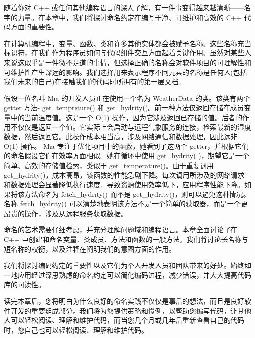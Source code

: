 随着你对 C++ 或任何其他编程语言的深入了解，有一件事变得越来越清晰——名字的力量。在本章中，我们将探讨命名约定在编写干净、可维护和高效的 C++ 代码方面的重要性。

在计算机编程中，变量、函数、类和许多其他实体都会被赋予名称。这些名称充当标识符，在我们作为程序员如何与代码组件交互方面起着关键作用。虽然对某些人来说这似乎是一件微不足道的事情，但选择正确的名称会对软件项目的可理解性和可维护性产生深远的影响。我们选择用来表示程序不同元素的名称是任何人(包括我们未来的自己)在接触我们的代码时所拥有的第一层文档。

假设一位名叫 Mia 的开发人员正在使用一个名为 WeatherData 的类。该类有两个 getter 方法- get\_tempreture() 和 get\_hydrity()。前一种方法仅返回存储在成员变量中的当前温度值。这是一个 O(1) 操作，因为它涉及返回已存储的值。后者的作用不仅仅是返回一个值。它实际上会启动与远程气象服务的连接，检索最新的湿度数据，然后返回它。此操作成本相当高，涉及网络通信和数据处理，因此远非 O(1) 操作。 Mia 专注于优化项目中的函数，她看到了这两个 getter，并根据它们的命名假设它们在效率方面相似。她在循环中使用 get\_hydrity( )，期望它是一个简单、高效的存储值检索，类似于 get\_temperature()。由于重复调用 get\_hydrity()，成本高昂，该函数的性能急剧下降。每次调用所涉及的网络请求和数据处理会显著降低执行速度，导致资源使用效率低下，应用程序性能下降。如果将该方法命名为 fetch\_hydrity() 而不是 get\_hydrity()，则可以避免这种情况。名称 fetch\_hydrity() 可以清楚地表明该方法不是一个简单的获取器，而是一个更昂贵的操作，涉及从远程服务获取数据。

命名的艺术需要仔细考虑，并充分理解问题域和编程语言。本章全面讨论了在 C++ 中创建和命名变量、类成员、方法和函数的一般方法。我们将讨论长名称与短名称的权衡，以及注释在阐明我们的意图方面的作用。

我们将探讨编码约定的重要性以及它们为个人开发人员和团队带来的好处。始终如一地应用经过深思熟虑的命名约定可以简化编码过程，减少错误，并大大提高代码库的可读性。

读完本章后，您将明白为什么良好的命名实践不仅仅是事后的想法，而且是良好软件开发的重要组成部分。我们将为您提供策略和惯例，以帮助您编写代码，让其他人可以轻松阅读、理解和维护代码，而当您几个月或几年后重新查看自己的代码时，您自己也可以轻松阅读、理解和维护代码。
